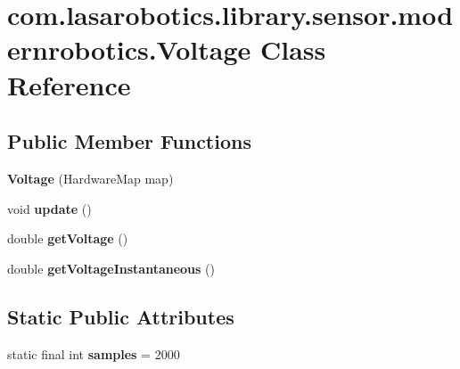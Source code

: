 \hypertarget{classcom_1_1lasarobotics_1_1library_1_1sensor_1_1modernrobotics_1_1_voltage}{}\section{com.\+lasarobotics.\+library.\+sensor.\+modernrobotics.\+Voltage Class Reference}
\label{classcom_1_1lasarobotics_1_1library_1_1sensor_1_1modernrobotics_1_1_voltage}
\subsection*{Public Member Functions}
\begin{DoxyCompactItemize}
\item 
\hypertarget{classcom_1_1lasarobotics_1_1library_1_1sensor_1_1modernrobotics_1_1_voltage_a0af81d1f9e8520345f8b9191caac1743}{}{\bfseries Voltage} (Hardware\+Map map)\label{classcom_1_1lasarobotics_1_1library_1_1sensor_1_1modernrobotics_1_1_voltage_a0af81d1f9e8520345f8b9191caac1743}

\item 
\hypertarget{classcom_1_1lasarobotics_1_1library_1_1sensor_1_1modernrobotics_1_1_voltage_aba942de2d0c69e8e07d1863cb238e597}{}void {\bfseries update} ()\label{classcom_1_1lasarobotics_1_1library_1_1sensor_1_1modernrobotics_1_1_voltage_aba942de2d0c69e8e07d1863cb238e597}

\item 
\hypertarget{classcom_1_1lasarobotics_1_1library_1_1sensor_1_1modernrobotics_1_1_voltage_a0be8cc68e70fd943692e98f60c9fb27b}{}double {\bfseries get\+Voltage} ()\label{classcom_1_1lasarobotics_1_1library_1_1sensor_1_1modernrobotics_1_1_voltage_a0be8cc68e70fd943692e98f60c9fb27b}

\item 
\hypertarget{classcom_1_1lasarobotics_1_1library_1_1sensor_1_1modernrobotics_1_1_voltage_a9017c4c9e740302e7eb289c6838d9e2d}{}double {\bfseries get\+Voltage\+Instantaneous} ()\label{classcom_1_1lasarobotics_1_1library_1_1sensor_1_1modernrobotics_1_1_voltage_a9017c4c9e740302e7eb289c6838d9e2d}

\end{DoxyCompactItemize}
\subsection*{Static Public Attributes}
\begin{DoxyCompactItemize}
\item 
\hypertarget{classcom_1_1lasarobotics_1_1library_1_1sensor_1_1modernrobotics_1_1_voltage_a820965cedb938e9f3ff87d3f0a005e3f}{}static final int {\bfseries samples} = 2000\label{classcom_1_1lasarobotics_1_1library_1_1sensor_1_1modernrobotics_1_1_voltage_a820965cedb938e9f3ff87d3f0a005e3f}

\end{DoxyCompactItemize}


